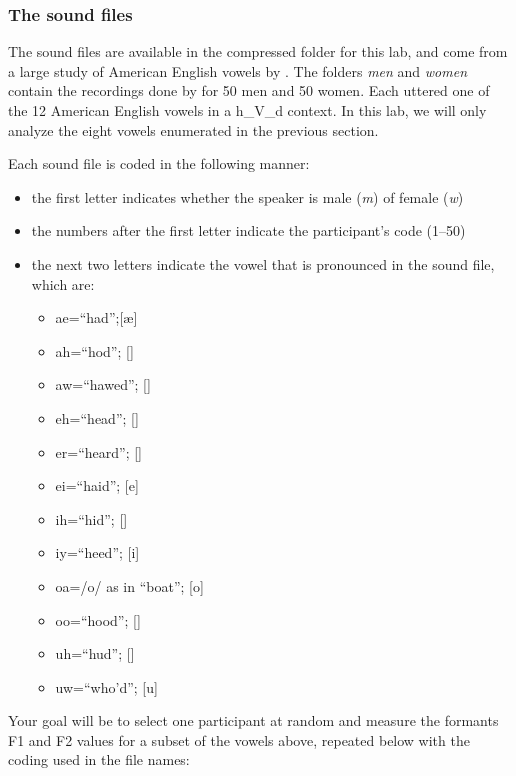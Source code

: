 \subsubsection{The sound files}

The sound files are available in the compressed folder for this lab, and come from a large study of American English vowels by . The folders \emph{men} and \emph{women} contain the recordings done by  for 50 men and 50 women. Each uttered one of the 12 American English vowels in a h\_V\_d context. In this lab, we will only analyze the eight vowels enumerated in the previous section.

Each sound file is coded in the following manner:

\begin{itemize}
\item the first letter indicates whether the speaker is male (\emph{m}) of female (\emph{w})
\item the numbers after the first letter indicate the participant's code (1--50)
\item the next two letters indicate the vowel that is pronounced in the sound file, which are:
    \begin{itemize}
    \item ae=``had'';[\ae{}]
    \item ah=``hod''; [\textscripta{}]
    \item aw=``hawed''; [\textopeno{}]
    \item eh=``head''; [\textepsilon{}]
    \item er=``heard''; [\textrhookschwa{}]
    \item ei=``haid''; [e]
    \item ih=``hid''; [\textsci{}]
    \item iy=``heed''; [i]
    \item oa=/o/ as in ``boat''; [o]
    \item oo=``hood''; [\textupsilon{}]
    \item uh=``hud''; [\textturnv]
    \item uw=``who'd''; [u]
    \end{itemize}
\end{itemize}

Your goal will be to select one participant at random and measure the formants F1 and F2 values for a subset of the vowels above, repeated below with the coding used in the file names:

